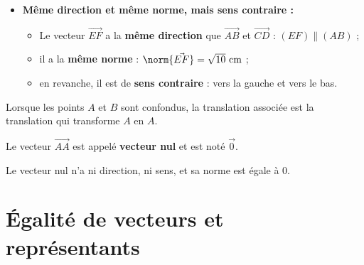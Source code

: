 \begin{exemple}
\begin{itemize}
		\item \textbf{Même direction et même norme, mais sens contraire :}
		      \begin{itemize}
			      \item Le vecteur $\vec{EF}$ a la \textbf{même direction} que $\vec{AB}$ et $\vec{CD}$ : $(EF) \parallel (AB)$ ;
			      \item il a la \textbf{même norme} : $\norm{\vec{EF}} = \sqrt{10}\text{ cm}$ ;
			      \item en revanche, il est de \textbf{sens contraire} : vers la gauche et vers le bas.
		      \end{itemize}
	\end{itemize}
\end{exemple}

\begin{definition}
	Lorsque les points $A$ et $B$ sont confondus, la translation associée est la translation qui transforme $A$ en $A$.

	Le vecteur $\vec{AA}$ est appelé \textbf{vecteur nul} et est noté $\vec{0}$.
\end{definition}

\begin{remarque}
	Le vecteur nul n'a ni direction, ni sens, et sa norme est égale à $0$.
\end{remarque}

\section{Égalité de vecteurs et représentants}

